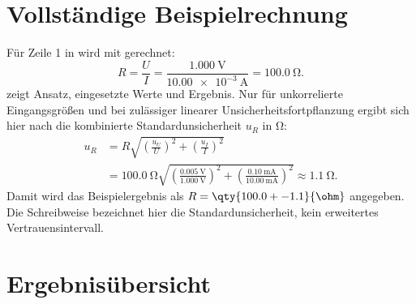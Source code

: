 \section{Vollständige Beispielrechnung}
Für Zeile 1 in  wird mit  gerechnet:
\begin{equation}
  R = \frac{U}{I}
    = \frac{\qty{1.000}{\volt}}{\qty{10.00e-3}{\ampere}}
    = \qty{100.0}{\ohm}.
  \label{eq:calculation}
\end{equation}
 zeigt Ansatz, eingesetzte Werte und Ergebnis.
Nur für unkorrelierte Eingangsgrößen und bei zulässiger linearer
Unsicherheitsfortpflanzung ergibt sich hier nach 
die kombinierte Standardunsicherheit $u_R$ in \unit{\ohm}:
\begin{equation}
  \begin{aligned}
    u_R &= R\sqrt{\left(\frac{u_U}{U}\right)^2
                    +\left(\frac{u_I}{I}\right)^2} \\
        &= \qty{100.0}{\ohm}
           \sqrt{\left(\frac{\qty{0.005}{\volt}}{\qty{1.000}{\volt}}\right)^2
                +\left(\frac{\qty{0.10}{\milli\ampere}}{\qty{10.00}{\milli\ampere}}\right)^2}
         \approx \qty{1.1}{\ohm}.
  \end{aligned}
  \label{eq:uncertainty}
\end{equation}
Damit wird das Beispielergebnis als
$R=\qty{100.0 +- 1.1}{\ohm}$ angegeben. Die Schreibweise bezeichnet hier
die Standardunsicherheit, kein erweitertes Vertrauensintervall.

\section{Ergebnisübersicht}
